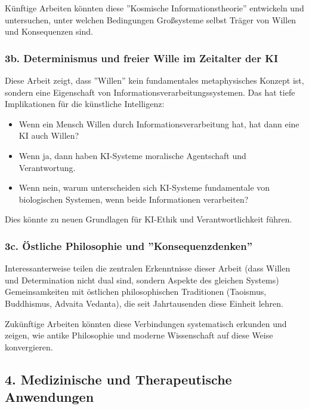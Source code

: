 \documentclass[a4paper,12pt]{article}
\theoremstyle{definition}
\begin{document}
Künftige Arbeiten könnten diese ''Kosmische Informationstheorie'' entwickeln und untersuchen, unter welchen Bedingungen Großsysteme selbst Träger von Willen und Konsequenzen sind.

\subsubsection{3b. Determinismus und freier Wille im Zeitalter der KI}

Diese Arbeit zeigt, dass ''Willen'' kein fundamentales metaphysisches Konzept ist, sondern eine Eigenschaft von Informationsverarbeitungssystemen. Das hat tiefe Implikationen für die künstliche Intelligenz:

\begin{itemize}
    \item Wenn ein Mensch Willen durch Informationsverarbeitung hat, hat dann eine KI auch Willen?
    
    \item Wenn ja, dann haben KI-Systeme moralische Agentschaft und Verantwortung.
    
    \item Wenn nein, warum unterscheiden sich KI-Systeme fundamentale von biologischen Systemen, wenn beide Informationen verarbeiten?
\end{itemize}

Dies könnte zu neuen Grundlagen für KI-Ethik und Verantwortlichkeit führen.

\subsubsection{3c. Östliche Philosophie und ''Konsequenzdenken''}

Interessanterweise teilen die zentralen Erkenntnisse dieser Arbeit (dass Willen und Determination nicht dual sind, sondern Aspekte des gleichen Systems) Gemeinsamkeiten mit östlichen philosophischen Traditionen (Taoismus, Buddhismus, Advaita Vedanta), die seit Jahrtausenden diese Einheit lehren. 

Zukünftige Arbeiten könnten diese Verbindungen systematisch erkunden und zeigen, wie antike Philosophie und moderne Wissenschaft auf diese Weise konvergieren.

\subsection{4. Medizinische und Therapeutische Anwendungen}
\end{document}
